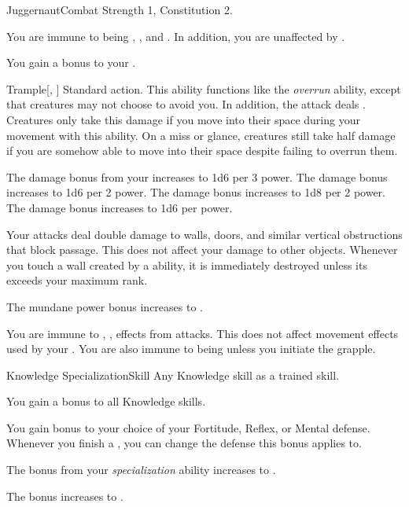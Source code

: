   \begin{feat}{Juggernaut}{Combat}
    \featpre Strength 1, Constitution 2.

     You are immune to being \slowed, \immobilized, and \paralyzed.
    In addition, you are unaffected by .

     You gain a  bonus to your .

    \begin{activeability}{Trample}[, ]
      \abilityusagetime Standard action.
      \rankline
      This ability functions like the \textit{overrun} ability, except that creatures may not choose to avoid you.
      In addition, the attack deals \damageranktwo.
      Creatures only take this damage if you move into their space during your movement with this ability.
      On a miss or glance, creatures still take half damage if you are somehow able to move into their space despite failing to overrun them.

      \rankline
       The damage bonus from your  increases to 1d6 per 3 power.
       The damage bonus increases to 1d6 per 2 power.
       The damage bonus increases to 1d8 per 2 power.
       The damage bonus increases to 1d6 per power.
    \end{activeability}

     Your attacks deal double damage to walls, doors, and similar vertical obstructions that block passage.
    This does not affect your damage to other objects.
    Whenever you touch a wall created by a  ability, it is immediately destroyed unless its  exceeds your maximum rank.

     The mundane power bonus increases to .

     You are immune to , ,  effects from attacks.
    This does not affect movement effects used by your .
    You are also immune to being \grappled unless you initiate the grapple.
  \end{feat}

  \begin{feat}{Knowledge Specialization}{Skill}
    \featpre Any Knowledge skill as a trained skill.

     You gain a  bonus to all Knowledge skills.

     You gain  bonus to your choice of your Fortitude, Reflex, or Mental defense.
    Whenever you finish a , you can change the defense this bonus applies to.

     The bonus from your \textit{specialization} ability increases to .

     The bonus increases to .
  \end{feat}

